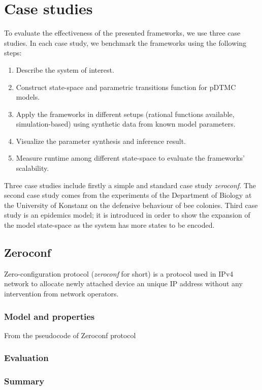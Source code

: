 \chapter{Case studies}
To evaluate the effectiveness of the presented frameworks, we use three case studies. In each case
study, we benchmark the frameworks using the following steps:
\begin{enumerate}
    \item Describe the system of interest.
    \item Construct state-space and parametric transitions function for pDTMC models.
    \item Apply the frameworks in different setups (rational functions available, simulation-based)
          using synthetic data from known model parameters.
    \item Visualize the parameter synthesis and inference result.
    \item Measure runtime among different state-space to evaluate the frameworks' scalability.
\end{enumerate}
Three case studies include firstly a simple and standard case study \textit{zeroconf}. The second
case study comes from the experiments of the Department of Biology at the University of Konstanz on
the defensive behaviour of bee colonies\cite{hajnal2019data}. Third case study is an epidemics
model; it is introduced in order to show the expansion of the model state-space as the system has
more states to be encoded.


\section{Zeroconf}
Zero-configuration protocol (\textit{zeroconf} for short) is a protocol used in IPv4 network to
allocate newly attached device an unique IP address without any intervention from network operators.

\subsection{Model and properties}
From the pseudocode of Zeroconf protocol
\subsection{Evaluation}
\subsection{Summary}

